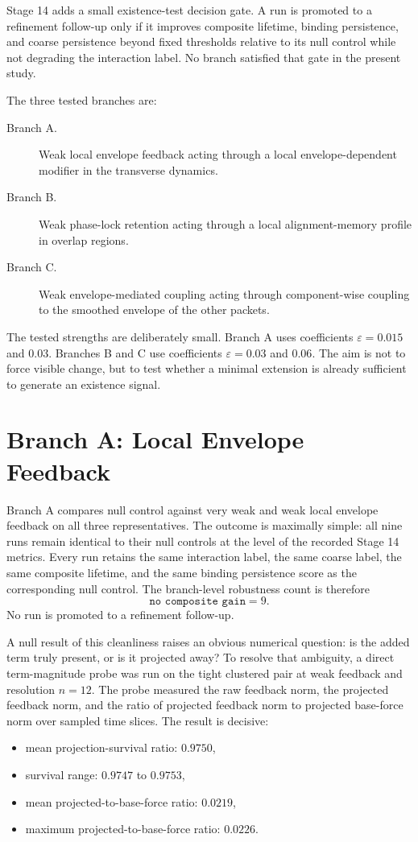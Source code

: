 \documentclass[11pt]{article}
\begin{document}
Stage 14 adds a small existence-test decision gate. A run is promoted to a refinement follow-up only if it improves composite lifetime, binding persistence, and coarse persistence beyond fixed thresholds relative to its null control while not degrading the interaction label. No branch satisfied that gate in the present study.

The three tested branches are:
\begin{description}
\item[Branch A.] Weak local envelope feedback acting through a local envelope-dependent modifier in the transverse dynamics.
\item[Branch B.] Weak phase-lock retention acting through a local alignment-memory profile in overlap regions.
\item[Branch C.] Weak envelope-mediated coupling acting through component-wise coupling to the smoothed envelope of the other packets.
\end{description}

The tested strengths are deliberately small. Branch A uses coefficients $\varepsilon = 0.015$ and $0.03$. Branches B and C use coefficients $\varepsilon = 0.03$ and $0.06$. The aim is not to force visible change, but to test whether a minimal extension is already sufficient to generate an existence signal.

\section{Branch A: Local Envelope Feedback}

Branch A compares null control against very weak and weak local envelope feedback on all three representatives. The outcome is maximally simple: all nine runs remain identical to their null controls at the level of the recorded Stage 14 metrics. Every run retains the same interaction label, the same coarse label, the same composite lifetime, and the same binding persistence score as the corresponding null control. The branch-level robustness count is therefore
\[
\texttt{no composite gain} = 9.
\]
No run is promoted to a refinement follow-up.

A null result of this cleanliness raises an obvious numerical question: is the added term truly present, or is it projected away? To resolve that ambiguity, a direct term-magnitude probe was run on the tight clustered pair at weak feedback and resolution $n=12$. The probe measured the raw feedback norm, the projected feedback norm, and the ratio of projected feedback norm to projected base-force norm over sampled time slices. The result is decisive:
\begin{itemize}
\item mean projection-survival ratio: $0.9750$,
\item survival range: $0.9747$ to $0.9753$,
\item mean projected-to-base-force ratio: $0.0219$,
\item maximum projected-to-base-force ratio: $0.0226$.
\end{itemize}
\end{document}
